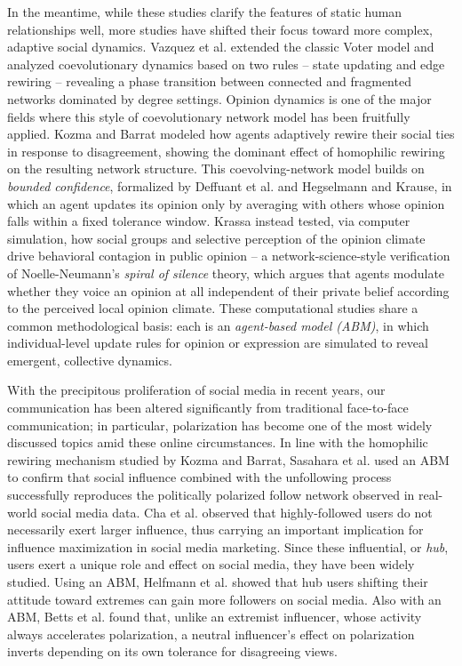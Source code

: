 \documentclass{svproc}
\begin{document}
In the meantime, while these studies clarify the features of
static human relationships well, more studies have shifted their focus toward
more complex, adaptive social dynamics.
Vazquez et al.\cite{vazquez2008}
extended the classic Voter model\cite{clifford1973} and
analyzed coevolutionary dynamics based on two
rules -- state updating and edge rewiring -- revealing a
phase transition between connected and fragmented networks dominated
by degree settings.
Opinion dynamics is one of the major fields where this style of
coevolutionary network model has been fruitfully applied.
Kozma and Barrat\cite{kozma2008} modeled how agents adaptively rewire their
social ties in response to disagreement, showing the dominant effect of
homophilic rewiring on the resulting network structure. This coevolving-network
model builds on \emph{bounded confidence}, formalized by Deffuant et
al.\cite{deffuant2000} and Hegselmann and Krause\cite{hegselmann2002}, in which
an agent updates its opinion only by averaging with others whose opinion falls
within a fixed tolerance window.
Krassa\cite{krassa1988} instead tested, via computer simulation, how social
groups and selective perception of the opinion climate drive behavioral
contagion in public opinion -- a network-science-style verification of
Noelle-Neumann's\cite{noelle-neumann1974} \emph{spiral of silence} theory, which
argues that agents modulate whether they voice an opinion at all
independent of their private belief according to the perceived local
opinion climate.
These computational studies\cite{deffuant2000,hegselmann2002,kozma2008,krassa1988}
share a common methodological basis: each is an \emph{agent-based model (ABM)},
in which individual-level update rules for opinion or expression are simulated
to reveal emergent, collective dynamics.

With the precipitous proliferation of social media in recent years,
our communication has been altered significantly from traditional
face-to-face communication; in particular, polarization has become
one of the most widely discussed topics amid these online
circumstances.
In line with the homophilic rewiring mechanism studied by Kozma and Barrat\cite{kozma2008},
Sasahara et al.\cite{sasahara2020} used an ABM to confirm that social influence
combined with the unfollowing process successfully reproduces the
politically polarized follow network observed in real-world social
media data.
Cha et al.\cite{cha2010} observed that highly-followed users do not necessarily
exert larger influence, thus carrying an important implication for influence
maximization in social media marketing.
Since these influential, or \emph{hub}, users exert a unique role and
effect on social media, they have been widely studied.
Using an ABM, Helfmann et al.\cite{helfm2023} showed that hub users shifting
their attitude toward extremes can gain more followers on social media.
Also with an ABM, Betts et al.\cite{betts2023} found that, unlike an
extremist influencer, whose activity always accelerates polarization, a
neutral influencer's effect on polarization inverts depending on its own
tolerance for disagreeing views.
\end{document}
